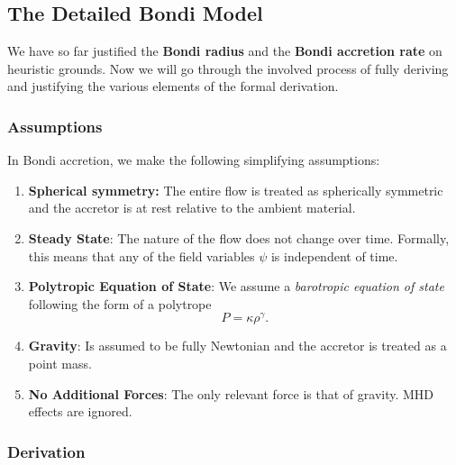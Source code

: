 \subsection{The Detailed Bondi Model}

We have so far justified the \textbf{Bondi radius} and the \textbf{Bondi accretion rate} on heuristic grounds. Now we will go through the involved process of fully deriving and justifying the various elements of the formal derivation.

\subsubsection*{Assumptions}

In Bondi accretion, we make the following simplifying assumptions:
\vspace{0.5cm}
\begin{enumerate}
    \item \textbf{Spherical symmetry: }The entire flow is treated as spherically symmetric and the accretor is at rest relative to the ambient material. 
    \item \textbf{Steady State}: The nature of the flow does not change over time. Formally, this means that any of the field variables $\psi$ is independent of time. 
    \item \textbf{Polytropic Equation of State}: We assume a \textit{barotropic equation of state} following the form of a polytrope
    \[
    P = \kappa \rho^\gamma.
    \]
    \item \textbf{Gravity}: Is assumed to be fully Newtonian and the accretor is treated as a point mass.
    \item \textbf{No Additional Forces}: The only relevant force is that of gravity. MHD effects are ignored.
\end{enumerate}

\subsubsection*{Derivation}

